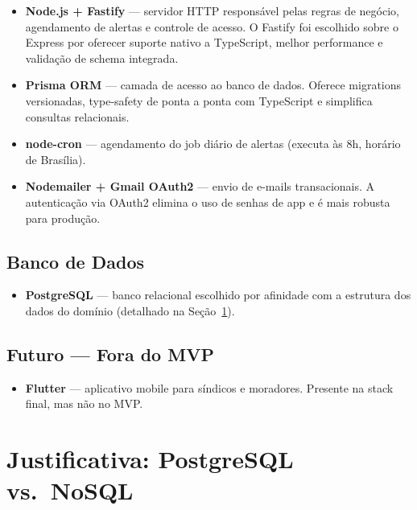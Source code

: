 \documentclass[12pt, a4paper]{article}
\begin{document}
\begin{itemize}[leftmargin=1.5em]
    \item \textbf{Node.js + Fastify} — servidor HTTP responsável pelas regras de negócio,
    agendamento de alertas e controle de acesso. O Fastify foi escolhido sobre o Express por
    oferecer suporte nativo a TypeScript, melhor performance e validação de schema integrada.
    \item \textbf{Prisma ORM} — camada de acesso ao banco de dados. Oferece migrations
    versionadas, type-safety de ponta a ponta com TypeScript e simplifica consultas relacionais.
    \item \textbf{node-cron} — agendamento do job diário de alertas (executa às 8h,
    horário de Brasília).
    \item \textbf{Nodemailer + Gmail OAuth2} — envio de e-mails transacionais. A autenticação
    via OAuth2 elimina o uso de senhas de app e é mais robusta para produção.
\end{itemize}

\subsection{Banco de Dados}

\begin{itemize}[leftmargin=1.5em]
    \item \textbf{PostgreSQL} — banco relacional escolhido por afinidade com a estrutura dos
    dados do domínio (detalhado na Seção~\ref{sec:banco}).
\end{itemize}

\subsection{Futuro — Fora do MVP}

\begin{itemize}[leftmargin=1.5em]
    \item \textbf{Flutter} — aplicativo mobile para síndicos e moradores. Presente na stack
    final, mas não no MVP.
\end{itemize}

\vspace{0.5cm}

\section{Justificativa: PostgreSQL vs.\ NoSQL}
\label{sec:banco}
\end{document}
